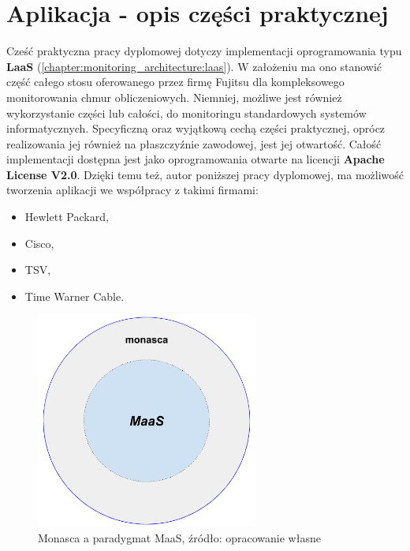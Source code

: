 \chapter{Aplikacja - opis części praktycznej}
\label{chapter:application}


Cześć praktyczna pracy dyplomowej dotyczy implementacji oprogramowania typu \textbf{LaaS} (\ref{chapter:monitoring_architecture:laas}).
W założeniu ma ono stanowić część całego stosu oferowanego przez firmę Fujitsu dla kompleksowego monitorowania chmur obliczeniowych.
Niemniej, możliwe jest również wykorzystanie części lub całości, do monitoringu standardowych systemów informatycznych. 
Specyficzną oraz wyjątkową cechą części praktycznej, oprócz realizowania jej również na płaszczyźnie zawodowej, jest jej otwartość.
Całość implementacji dostępna jest jako oprogramowania otwarte na licencji \textbf{Apache License V2.0}. 
Dzięki temu też, autor poniższej pracy dyplomowej, ma możliwość tworzenia aplikacji we współpracy z takimi firmami:
\begin{itemize}
    \item Hewlett Packard,
    \item Cisco,
    \item TSV,
    \item Time Warner Cable.
\end{itemize}
    
\begin{figure}[H]
    \centering
    \includegraphics[width=0.65\textwidth]{images/monasca_with_maas}
    \caption[Monasca a paradygmat MaaS]{
        Monasca a paradygmat MaaS, źródło: opracowanie własne
    }
    \label{chapter:application:monasca_and_maas:diagram}
\end{figure}

